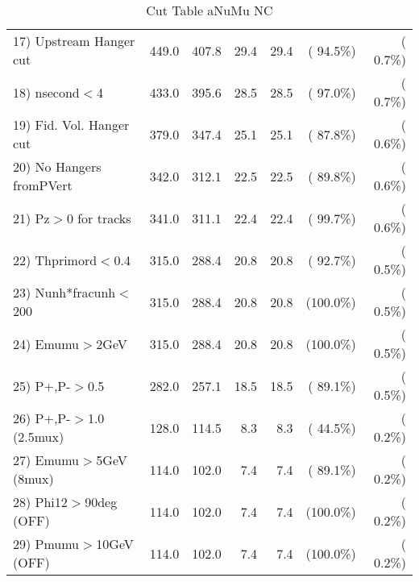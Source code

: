 \begin{table}[h!]
\begin{tabular}{||l||r|r|r|r|r|r||}
 17) Upstream Hanger cut  &        449.0 &        407.8 &         29.4 &         29.4 & ( 94.5\%) & (  0.7\%) \\
 18) nsecond$<$4          &        433.0 &        395.6 &         28.5 &         28.5 & ( 97.0\%) & (  0.7\%) \\
 19) Fid. Vol. Hanger cut &        379.0 &        347.4 &         25.1 &         25.1 & ( 87.8\%) & (  0.6\%) \\
 20) No Hangers fromPVert &        342.0 &        312.1 &         22.5 &         22.5 & ( 89.8\%) & (  0.6\%) \\
 21) Pz$>$0 for tracks    &        341.0 &        311.1 &         22.4 &         22.4 & ( 99.7\%) & (  0.6\%) \\
 22) Thprimord$<$0.4      &        315.0 &        288.4 &         20.8 &         20.8 & ( 92.7\%) & (  0.5\%) \\
 23) Nunh*fracunh$<$200   &        315.0 &        288.4 &         20.8 &         20.8 & (100.0\%) & (  0.5\%) \\
 24) Emumu$>$2GeV         &        315.0 &        288.4 &         20.8 &         20.8 & (100.0\%) & (  0.5\%) \\
 25) P+,P-$>$0.5          &        282.0 &        257.1 &         18.5 &         18.5 & ( 89.1\%) & (  0.5\%) \\
 26) P+,P-$>$1.0 (2.5mux) &        128.0 &        114.5 &          8.3 &          8.3 & ( 44.5\%) & (  0.2\%) \\
 27) Emumu$>$5GeV  (8mux) &        114.0 &        102.0 &          7.4 &          7.4 & ( 89.1\%) & (  0.2\%) \\
 28) Phi12$>$90deg  (OFF) &        114.0 &        102.0 &          7.4 &          7.4 & (100.0\%) & (  0.2\%) \\
 29) Pmumu$>$10GeV  (OFF) &        114.0 &        102.0 &          7.4 &          7.4 & (100.0\%) & (  0.2\%) \\
 \hline
 \hline
 \end{tabular}
 \caption{Cut Table  aNuMu NC }
 \label{tab-cutcohjpsi-mumu_anumunc}
 \end{table}
